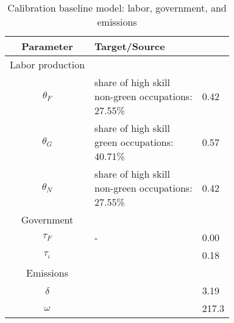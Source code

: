  \begin{table}[hh!!!!!]
 	\begin{center}
 		\captionsetup{width=0.9\textwidth}
 		\caption{ Calibration baseline model: labor, government, and emissions}
 		\label{tab:calib2}
 		\begin{tabular}{c|ll}
 			\hline \hline
 			Parameter& Target/Source& \makecell[l]{Calibration}\\ 
 			\hline
 			\hline
 			Labor production&\multicolumn{2}{c}{}\\
 			\hline 
 			
 			\hline
 			$\theta_F$&\makecell[l]{share of high skill\\ non-green occupations: \\27.55\% \citep{Consoli2016DoCapital} }&0.42\\
 			$\theta_G$&\makecell[l]{share of high skill\\ green occupations: \\40.71\% \citep{Consoli2016DoCapital}}&0.57 \\
 			$\theta_N$&\makecell[l]{share of high skill\\ non-green occupations: \\27.55\% \citep{Consoli2016DoCapital} }&0.42\\
 			\hline
 			\hline
 			Government&\multicolumn{2}{c}{}\\
 			\hline
 			
 			\hline
 			$\tau_F$&- &0.00\\
 			$\tau_\iota$&\cite{Heathcote2017OptimalFramework} &0.18\\
 			\hline	
 			\hline
 			Emissions&\multicolumn{2}{c}{}\\
 			\hline
 			
 			\hline
 			$\delta$& \makecell[l]{\cite{EPAems}}&3.19\\
 			$\omega$& \cite{EPAems}&217.3\\
 			\hline \hline
 		\end{tabular}
 	\end{center}
 \end{table}
 
